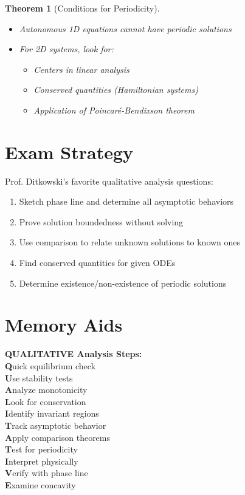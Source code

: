 \documentclass[12pt]{article}
\newtheorem{theorem}{Theorem}
\begin{document}
\begin{theorem}[Conditions for Periodicity]
\begin{itemize}
    \item Autonomous 1D equations cannot have periodic solutions
    \item For 2D systems, look for:
    \begin{itemize}
        \item Centers in linear analysis
        \item Conserved quantities (Hamiltonian systems)
        \item Application of Poincaré-Bendixson theorem
    \end{itemize}
\end{itemize}
\end{theorem}

\section{Exam Strategy}

\begin{warning}
Prof. Ditkowski's favorite qualitative analysis questions:
\begin{enumerate}
    \item Sketch phase line and determine all asymptotic behaviors
    \item Prove solution boundedness without solving
    \item Use comparison to relate unknown solutions to known ones
    \item Find conserved quantities for given ODEs
    \item Determine existence/non-existence of periodic solutions
\end{enumerate}
\end{warning}

\section{Memory Aids}

\begin{center}
\textbf{QUALITATIVE Analysis Steps:}\\
\textbf{Q}uick equilibrium check\\
\textbf{U}se stability tests\\
\textbf{A}nalyze monotonicity\\
\textbf{L}ook for conservation\\
\textbf{I}dentify invariant regions\\
\textbf{T}rack asymptotic behavior\\
\textbf{A}pply comparison theorems\\
\textbf{T}est for periodicity\\
\textbf{I}nterpret physically\\
\textbf{V}erify with phase line\\
\textbf{E}xamine concavity
\end{center}
\end{document}
